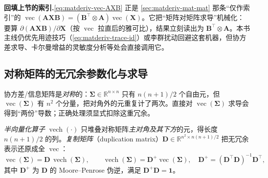 \begin{note}
\textbf{回填上节的索引.}\;\cref{eq:matderiv-vec-AXB} 正是 \cref{sec:matderiv-mat-mat} 那条“仅作索引”的 $\operatorname{vec}(\mathbf{A}\mathbf{X}\mathbf{B})=(\mathbf{B}^\top\otimes\mathbf{A})\operatorname{vec}(\mathbf{X})$。它把“矩阵对矩阵求导”机械化：要算 $\partial(\mathbf{A}\mathbf{X}\mathbf{B})/\partial\mathbf{X}$（按 $\operatorname{vec}$ 拉直后的雅可比），结果立刻读出为 $\mathbf{B}^\top\otimes\mathbf{A}$。本书主线仍优先用迹技巧（\cref{eq:matderiv-trace-id}）或李群扰动回避这套机器，但协方差求导、卡尔曼增益的灵敏度分析等处会直接调用它。
\end{note}

\subsection{对称矩阵的无冗余参数化与求导}
\label{sec:matderiv-vech}

协方差/信息矩阵是\emph{对称}的：$\boldsymbol{\Sigma}\in\mathbb{R}^{n\times n}$ 只有 $n(n+1)/2$ 个自由元，但 $\operatorname{vec}(\boldsymbol{\Sigma})$ 有 $n^2$ 个分量，把对角外的元重复计了两次。直接对 $\operatorname{vec}(\boldsymbol{\Sigma})$ 求导会得到“两份”导数；正确处理须显式扣除这重冗余。

\begin{definition}[半向量化与复制矩阵]\label{def:matderiv-vech}
\emph{半向量化算子} $\operatorname{vech}(\cdot)$ 只堆叠对称矩阵\emph{主对角及其下方}的元，得长度 $n(n+1)/2$ 的列。\emph{复制矩阵}（duplication matrix）$\mathbf{D}\in\mathbb{R}^{n^2\times n(n+1)/2}$ 把无冗余表示还原成全 $\operatorname{vec}$\cite{magnus2019matrix,barfoot2024state}：
\begin{equation}
  \operatorname{vec}(\boldsymbol{\Sigma})=\mathbf{D}\,\operatorname{vech}(\boldsymbol{\Sigma}),\qquad
  \operatorname{vech}(\boldsymbol{\Sigma})=\mathbf{D}^{+}\operatorname{vec}(\boldsymbol{\Sigma}),\quad \mathbf{D}^{+}=(\mathbf{D}^\top\mathbf{D})^{-1}\mathbf{D}^\top,
  \label{eq:matderiv-dup}
\end{equation}
其中 $\mathbf{D}^{+}$ 为 $\mathbf{D}$ 的 Moore--Penrose 伪逆，满足 $\mathbf{D}^{+}\mathbf{D}=\mathbf{1}$。
\end{definition}

